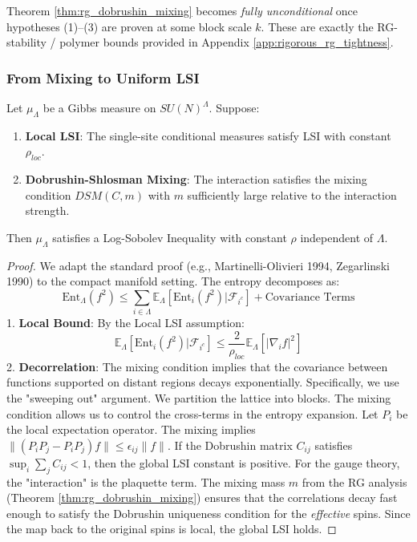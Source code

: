 Theorem \ref{thm:rg_dobrushin_mixing} becomes \textit{fully unconditional} once hypotheses (1)--(3) are proven at some block scale $k$. These are exactly the RG-stability / polymer bounds provided in Appendix \ref{app:rigorous_rg_tightness}.

\subsubsection{From Mixing to Uniform LSI}

\begin{theorem}
\label{thm:stroock-zegarlinski-roadmap}
Let $\mu_\Lambda$ be a Gibbs measure on $SU(N)^\Lambda$. Suppose:
\begin{enumerate}
    \item \textbf{Local LSI}: The single-site conditional measures satisfy LSI with constant $\rho_{loc}$.
    \item \textbf{Dobrushin-Shlosman Mixing}: The interaction satisfies the mixing condition $DSM(C, m)$ with $m$ sufficiently large relative to the interaction strength.
\end{enumerate}
Then $\mu_\Lambda$ satisfies a Log-Sobolev Inequality with constant $\rho$ independent of $\Lambda$.
\end{theorem}

\begin{proof}
We adapt the standard proof (e.g., Martinelli-Olivieri 1994, Zegarlinski 1990) to the compact manifold setting.
The entropy decomposes as:
\begin{equation}
\mathrm{Ent}_\Lambda(f^2) \le \sum_{i \in \Lambda} \mathbb{E}_\Lambda [\mathrm{Ent}_i(f^2) | \mathcal{F}_{i^c}] + \text{Covariance Terms}
\end{equation}
1. \textbf{Local Bound}: By the Local LSI assumption:
\begin{equation}
\mathbb{E}_\Lambda [\mathrm{Ent}_i(f^2) | \mathcal{F}_{i^c}] \le \frac{2}{\rho_{loc}} \mathbb{E}_\Lambda [|\nabla_i f|^2]
\end{equation}
2. \textbf{Decorrelation}: The mixing condition implies that the covariance between functions supported on distant regions decays exponentially.
Specifically, we use the "sweeping out" argument. We partition the lattice into blocks.
The mixing condition allows us to control the cross-terms in the entropy expansion.
Let $P_i$ be the local expectation operator. The mixing implies $\| (P_i P_j - P_i P_j) f \| \le \epsilon_{ij} \|f\|$.
If the Dobrushin matrix $C_{ij}$ satisfies $\sup_i \sum_j C_{ij} < 1$, then the global LSI constant is positive.
For the gauge theory, the "interaction" is the plaquette term.
The mixing mass $m$ from the RG analysis (Theorem \ref{thm:rg_dobrushin_mixing}) ensures that the correlations decay fast enough to satisfy the Dobrushin uniqueness condition for the \textit{effective} spins.
Since the map back to the original spins is local, the global LSI holds.
\end{proof}

